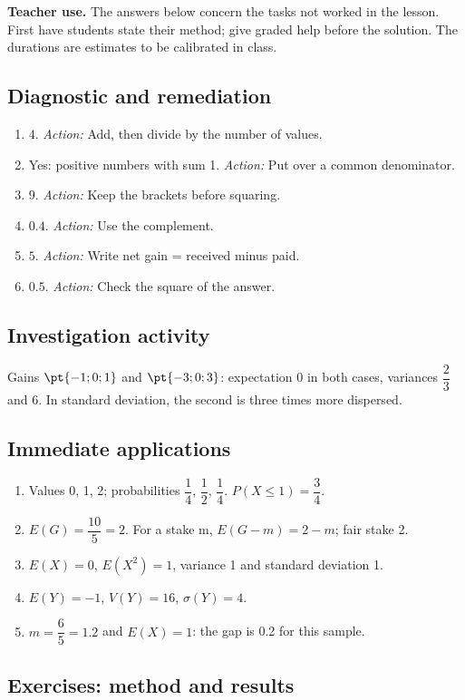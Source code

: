 \label{C08-CORR}
\textbf{Teacher use.} The answers below concern the tasks not worked in the lesson. First have students state their method; give graded help before the solution. The durations are estimates to be calibrated in class.
\subsection*{Diagnostic and remediation}
\begin{enumerate}
\item $4$. \textit{Action:} Add, then divide by the number of values.
\item Yes: positive numbers with sum 1. \textit{Action:} Put over a common denominator.
\item $9$. \textit{Action:} Keep the brackets before squaring.
\item $\num{0,4}$. \textit{Action:} Use the complement.
\item $5$. \textit{Action:} Write net gain = received minus paid.
\item $\num{0,5}$. \textit{Action:} Check the square of the answer.
\end{enumerate}
\subsection*{Investigation activity}
Gains $\pt{-1;0;1}$ and $\pt{-3;0;3}$: expectation 0 in both cases, variances $\dfrac{2}{3}$ and 6. In standard deviation, the second is three times more dispersed.
\subsection*{Immediate applications}
\begin{enumerate}
\item Values 0, 1, 2; probabilities $\dfrac{1}{4}$, $\dfrac{1}{2}$, $\dfrac{1}{4}$. $P(X\leq1)=\dfrac{3}{4}$.
\item $E(G)=\dfrac{10}{5}=2$. For a stake m, $E(G-m)=2-m$; fair stake 2.
\item $E(X)=0$, $E(X^2)=1$, variance 1 and standard deviation 1.
\item $E(Y)=-1$, $V(Y)=16$, $\sigma(Y)=4$.
\item $m=\dfrac{6}{5}=\num{1,2}$ and $E(X)=1$: the gap is \num{0,2} for this sample.
\end{enumerate}
\subsection*{Exercises: method and results}
